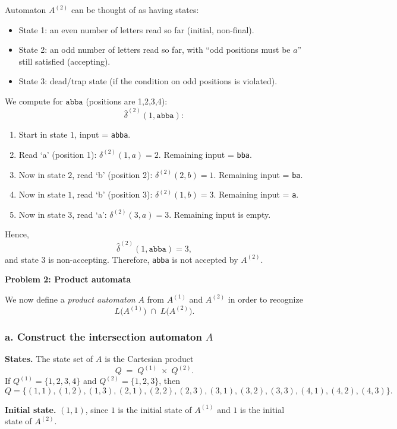 \documentclass{article}
\theoremstyle{theorem}
\theoremstyle{definition}
\theoremstyle{remark}
\begin{document}
Automaton $A^{(2)}$ can be thought of as having states:
\begin{itemize}
    \item State 1: an even number of letters read so far (initial, non-final).
    \item State 2: an odd number of letters read so far, with ``odd positions must be $a$'' still satisfied (accepting).
    \item State 3: dead/trap state (if the condition on odd positions is violated).
\end{itemize}
We compute for \(\texttt{abba}\) (positions are 1,2,3,4):
\[
\widehat{\delta}^{(2)}(1,\texttt{abba}):
\]
\begin{enumerate}
    \item Start in state $1$, input = \texttt{abba}.
    \item Read `a' (position 1): $\delta^{(2)}(1,a) = 2$. Remaining input = \texttt{bba}.
    \item Now in state $2$, read `b' (position 2): $\delta^{(2)}(2,b) = 1$. Remaining input = \texttt{ba}.
    \item Now in state $1$, read `b' (position 3): $\delta^{(2)}(1,b) = 3$. Remaining input = \texttt{a}.
    \item Now in state $3$, read `a': $\delta^{(2)}(3,a) = 3$. Remaining input is empty.
\end{enumerate}
Hence,
\[
\widehat{\delta}^{(2)}(1,\texttt{abba}) = 3,
\]
and state $3$ is non-accepting. Therefore, \texttt{abba} is not accepted by $A^{(2)}$.

\bigskip

\textbf{Problem 2: Product automata}

We now define a \emph{product automaton} $A$ from $A^{(1)}$ and $A^{(2)}$ in order to recognize 
\[
L\bigl(A^{(1)}\bigr) \;\cap\; L\bigl(A^{(2)}\bigr).
\]

\subsubsection*{a. Construct the intersection automaton $A$}

\noindent \textbf{States.} The state set of $A$ is the Cartesian product
\[
Q \;=\; Q^{(1)} \;\times\; Q^{(2)}.
\]
If $Q^{(1)} = \{1,2,3,4\}$ and $Q^{(2)} = \{1,2,3\}$, then
\[
Q = \{(1,1),(1,2),(1,3),(2,1),(2,2),(2,3),(3,1),(3,2),(3,3),(4,1),(4,2),(4,3)\}.
\]

\noindent \textbf{Initial state.} $(1,1)$, since $1$ is the initial state of $A^{(1)}$ and $1$ is the initial state of $A^{(2)}$.
\end{document}
